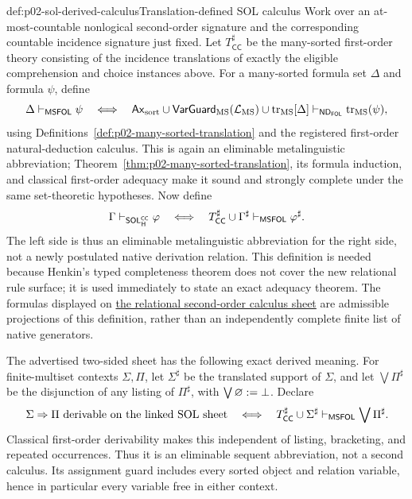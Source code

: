 \begin{hbdefinition}{def:p02-sol-derived-calculus}{Translation-defined SOL calculus}
Work over an at-most-countable nonlogical second-order signature and the
corresponding countable incidence signature just fixed.  Let
\(T_{\mathsf{CC}}^\sharp\) be the many-sorted first-order theory
consisting of the incidence translations of exactly the eligible
comprehension and choice instances above.  For a many-sorted formula set
\(\Delta\) and formula \(\psi\), define
\[
 \Delta\vdash_{\mathsf{MSFOL}}\psi
 \quad\Longleftrightarrow\quad
 \mathsf{Ax}_{\mathrm{sort}}\cup
 \mathsf{VarGuard}_{\mathrm{MS}}(\mathcal{L}_{\mathrm{MS}})\cup
 \operatorname{tr}_{\mathrm{MS}}[\Delta]
 \vdash_{\mathsf{ND}_{\mathsf{FOL}}}
 \operatorname{tr}_{\mathrm{MS}}(\psi),
\]
using Definitions~\ref{def:p02-many-sorted-translation} and the registered
first-order natural-deduction calculus.  This is again an eliminable
metalinguistic abbreviation; Theorem~\ref{thm:p02-many-sorted-translation},
its formula induction, and classical first-order adequacy make it sound and
strongly complete under the same set-theoretic hypotheses.  Now define
\[
 \Gamma\vdash_{\mathsf{SOL}_{\mathrm H}^{\mathsf{CC}}}\varphi
 \quad\Longleftrightarrow\quad
 T_{\mathsf{CC}}^\sharp\cup\Gamma^\sharp
 \vdash_{\mathsf{MSFOL}}\varphi^\sharp.
\]
The left side is thus an eliminable metalinguistic abbreviation for the right
side, not a newly postulated native derivation relation.  This definition is
needed because Henkin's typed completeness theorem does not cover the new
relational rule surface; it is used immediately to state an exact adequacy
theorem.  The formulas displayed on
\hyperref[sheet:sol]{the relational second-order calculus sheet} are admissible
projections of this definition, rather than an independently complete finite
list of native generators.

The advertised two-sided sheet has the following exact derived meaning.  For
finite-multiset contexts \(\Sigma,\Pi\), let \(\Sigma^\sharp\) be the
translated support of \(\Sigma\), and let \(\bigvee\Pi^\sharp\) be the
disjunction of any listing of \(\Pi^\sharp\), with
\(\bigvee\varnothing\mathrel{:=}\bot\).  Declare
\[
 \Sigma\Rightarrow\Pi\text{ derivable on the linked SOL sheet}
 \quad\Longleftrightarrow\quad
 T_{\mathsf{CC}}^\sharp\cup\Sigma^\sharp
 \vdash_{\mathsf{MSFOL}}\bigvee\Pi^\sharp.
\]
Classical first-order derivability makes this independent of listing,
bracketing, and repeated occurrences.  Thus it is an eliminable sequent
abbreviation, not a second calculus.  Its assignment guard includes every
sorted object and relation variable, hence in particular every variable free
in either context.
\end{hbdefinition}

